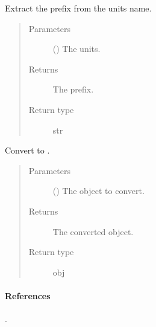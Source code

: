 \documentclass[letterpaper,10pt,english]{sphinxmanual}
\begin{document}
\begin{fulllineitems}
\label{\detokenize{api:tasmania.utils.utils._get_prefix}}
Extract the prefix from the units name.
\begin{quote}\begin{description}
\item[{Parameters}] \leavevmode
{} () \textendash{} The units.

\item[{Returns}] \leavevmode
The prefix.

\item[{Return type}] \leavevmode
str

\end{description}\end{quote}

\end{fulllineitems}


\begin{fulllineitems}
\label{\detokenize{api:tasmania.utils.utils.convert_datetime64_to_datetime}}
Convert  to .
\begin{quote}\begin{description}
\item[{Parameters}] \leavevmode
{} () \textendash{} The  object to convert.

\item[{Returns}] \leavevmode
The converted  object.

\item[{Return type}] \leavevmode
obj

\end{description}\end{quote}
\paragraph{References}

.

\end{fulllineitems}
\end{document}
